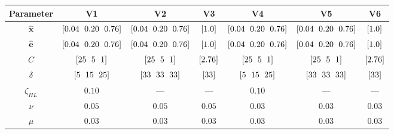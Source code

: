 \begin{tabular}{ccccccc}
	\toprule
	  Parameter    &           V1            &           V2            &      V3       &           V4            &           V5            &      V6       \\
	\midrule
	$\bm{\hat{x}}$ & $\tarr{0.04,0.20,0.76}$ & $\tarr{0.04,0.20,0.76}$ & $\tarr{1.0}$  & $\tarr{0.04,0.20,0.76}$ & $\tarr{0.04,0.20,0.76}$ & $\tarr{1.0}$  \\
	$\bm{\hat{e}}$ & $\tarr{0.04,0.20,0.76}$ & $\tarr{0.04,0.20,0.76}$ & $\tarr{1.0}$  & $\tarr{0.04,0.20,0.76}$ & $\tarr{0.04,0.20,0.76}$ & $\tarr{1.0}$  \\
	     $C$       &     $\tarr{25,5,1}$     &     $\tarr{25,5,1}$     & $\tarr{2.76}$ &     $\tarr{25,5,1}$     &     $\tarr{25,5,1}$     & $\tarr{2.76}$ \\
	   $\delta$    &    $\tarr{5,15,25}$     &    $\tarr{33,33,33}$    &  $\tarr{33}$  &    $\tarr{5,15,25}$     &    $\tarr{33,33,33}$    &  $\tarr{33}$  \\
	 $\zeta_{HL}$  &         $0.10$          &           ---           &      ---      &         $0.10$          &           ---           &      ---      \\
	    $\nu$      &         $0.05$          &         $0.05$          &    $0.05$     &         $0.03$          &         $0.03$          &    $0.03$     \\
	    $\mu$      &         $0.03$          &         $0.03$          &    $0.03$     &         $0.03$          &         $0.03$          &    $0.03$     \\
	\bottomrule
\end{tabular}